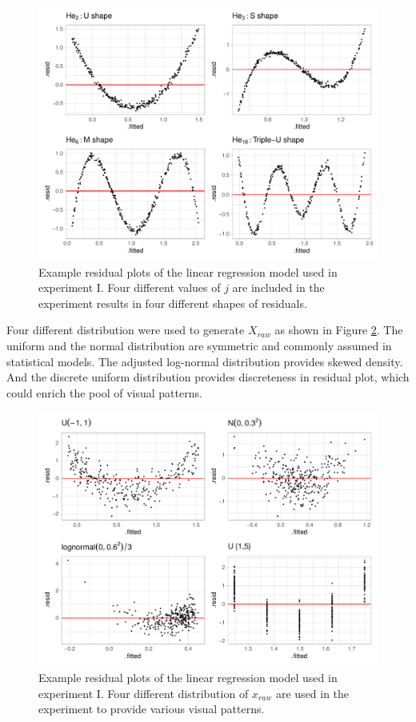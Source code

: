 \documentclass[]{interact}
\theoremstyle{plain}%
\theoremstyle{definition}
\theoremstyle{remark}
\begin{document}
\begin{figure}
\includegraphics[width=1\linewidth]{paper_comparison_files/figure-latex/different-shape-of-herimite-1} \caption{Example residual plots of the linear regression model used in experiment I. Four different values of $j$ are included in the experiment results in four different shapes of residuals.}\label{fig:different-shape-of-herimite}
\end{figure}

Four different distribution were used to generate \(X_{raw}\) as shown
in Figure \ref{fig:different-dist}. The uniform and the normal
distribution are symmetric and commonly assumed in statistical models.
The adjusted log-normal distribution provides skewed density. And the
discrete uniform distribution provides discreteness in residual plot,
which could enrich the pool of visual patterns.

\begin{figure}
\includegraphics[width=1\linewidth]{paper_comparison_files/figure-latex/different-dist-1} \caption{Example residual plots of the linear regression model used in experiment I. Four different distribution of $x_{raw}$ are used in the experiment to provide various visual patterns.}\label{fig:different-dist}
\end{figure}
\end{document}
